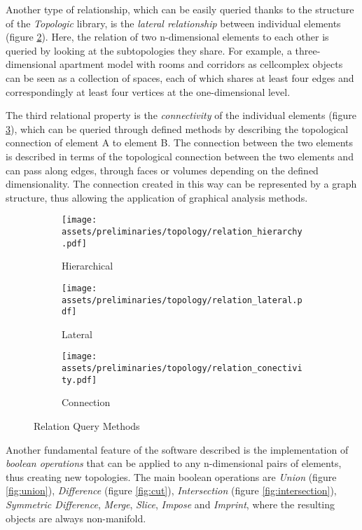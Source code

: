 \documentclass[a4paper, 12pt]{report}
\begin{document}
Another type of relationship, which can be easily queried thanks to the structure of the \textit{Topologic} library, is the \textit{lateral relationship} between individual elements (figure \ref{fig:lateral}). Here, the relation of two n-dimensional elements to each other is queried by looking at the subtopologies they share. For example, a three-dimensional apartment model with rooms and corridors as \gls{cellcomplex} objects can be seen as a collection of spaces, each of which shares at least four edges and correspondingly at least four vertices at the one-dimensional level.

The third relational property is the \textit{connectivity} of the individual elements (figure \ref{fig:connection}), which can be queried through defined methods by describing the topological connection of element A to element B. The connection between the two elements is described in terms of the topological connection between the two elements and can pass along edges, through faces or volumes depending on the defined dimensionality. The connection created in this way can be represented by a graph structure, thus allowing the application of graphical analysis methods.

\begin{figure}
\centering
\begin{subfigure}{.33\textwidth}
\centering
\texttt{[image: assets/preliminaries/topology/relation\_hierarchy.pdf]}
\caption{Hierarchical}
\label{fig:hierarchical}
\end{subfigure}%
\begin{subfigure}{.33\textwidth}
\centering
\texttt{[image: assets/preliminaries/topology/relation\_lateral.pdf]}
\caption{Lateral}
\label{fig:lateral}
\end{subfigure}%
\begin{subfigure}{.33\textwidth}
\centering
\texttt{[image: assets/preliminaries/topology/relation\_conectivity.pdf]}
\caption{Connection}
\label{fig:connection}
\end{subfigure}
\caption{Relation Query Methods}
\label{fig:relation-query-methods}
\end{figure}

Another fundamental feature of the software described is the implementation of \textit{\Glspl{boolean operation}} that can be applied to any n-dimensional pairs of elements, thus creating new topologies. The main \Glspl{boolean operation} are \textit{Union} (figure \ref{fig:union}), \textit{Difference} (figure \ref{fig:cut}), \textit{Intersection} (figure \ref{fig:intersection}), \textit{Symmetric Difference}, \textit{Merge}, \textit{Slice}, \textit{Impose} and \textit{Imprint}, where the resulting objects are always non-\gls{manifold}.
\end{document}
